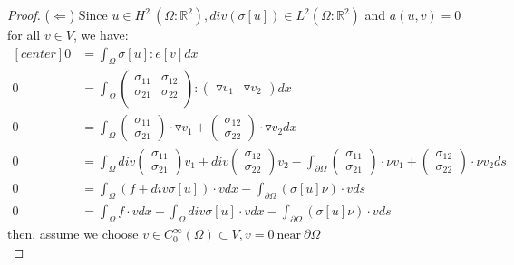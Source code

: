 \documentclass[a4paper,11pt]{article}
\newcommand{\R}{\mathbb{R}}
\begin{document}
\begin{proof}
	($\Leftarrow$)
	Since $u\in H^2\ (\Omega : \R^2), div(\sigma[u]) \in L^2(\Omega: \R^2)$ and $a(u,v)=0$ for all $v \in V$, we have:
	\begin{equation*}
	\begin{aligned}[center]
	0 &= \int_\Omega \sigma[u] : e[v] dx\\
	0 &= \int_\Omega \begin{pmatrix}
	\sigma_{11} & \sigma_{12}\\
	\sigma_{21} & \sigma_{22}\\
	\end{pmatrix} : \begin{pmatrix}
	\triangledown v_1 & \triangledown v_2
	\end{pmatrix} dx\\
	0 &= \int_\Omega \begin{pmatrix}
	\sigma_{11}\\
	\sigma_{21}
	\end{pmatrix} \cdot \triangledown v_1 + \begin{pmatrix}
	\sigma_{12}\\
	\sigma_{22}
	\end{pmatrix} \cdot \triangledown v_2 dx\\
	0 &= \int_\Omega div \begin{pmatrix}
	\sigma_{11}\\
	\sigma_{21}
	\end{pmatrix} v_1 + div \begin{pmatrix}
	\sigma_{12}\\
	\sigma_{22}
	\end{pmatrix} v_2 - \int_{\partial\Omega} \begin{pmatrix}
	\sigma_{11}\\
	\sigma_{21}
	\end{pmatrix} \cdot \nu v_1 + \begin{pmatrix}
	\sigma_{12}\\
	\sigma_{22}
	\end{pmatrix} \cdot \nu v_2 ds\\
	0 &= \int_\Omega (f + div \sigma[u]) \cdot v dx - \int_{\partial\Omega} (\sigma[u]\nu)\cdot v ds\\
	0 &= \int_\Omega f \cdot v dx + \int_\Omega div \sigma[u] \cdot v dx - \int_{\partial\Omega} (\sigma[u]\nu)\cdot v ds
	\end{aligned}
	\end{equation*}
	then, assume we choose $v \in C_0^\infty (\Omega) \subset V, v = 0\ \text{near}\ \partial\Omega$\\

\end{proof}
\end{document}
